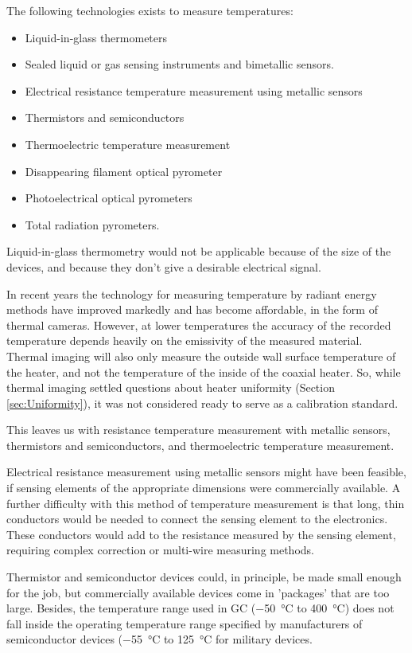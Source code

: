 The following technologies exists to measure temperatures:
\begin{itemize}
	\item Liquid-in-glass thermometers
	\item Sealed liquid or gas sensing instruments and bimetallic sensors.
	\item Electrical resistance temperature measurement using metallic sensors
	\item Thermistors and semiconductors
	\item Thermoelectric temperature measurement
	\item Disappearing filament optical pyrometer
	\item Photoelectrical optical pyrometers
	\item Total radiation pyrometers.
\end{itemize}

Liquid-in-glass thermometry would not be applicable because of the size of the
devices, and because they don't give a desirable electrical signal. 

In recent years the technology for measuring temperature by radiant energy
methods have improved markedly and has become affordable, in the form of thermal
cameras. However, at lower temperatures the accuracy of the recorded temperature
depends heavily on the emissivity of the measured material. Thermal imaging will
also only measure the outside wall surface temperature of the heater, and not
the temperature of the inside of the coaxial heater. So, while thermal imaging
settled questions about heater uniformity (Section \ref{sec:Uniformity}), it was
not considered ready to serve as a calibration standard. 

This leaves us with resistance temperature measurement with metallic sensors,
thermistors and semiconductors, and thermoelectric temperature measurement.

Electrical resistance measurement using metallic sensors might have been
feasible, if sensing elements of the appropriate dimensions were commercially
available. A further difficulty with this method of temperature measurement is
that long, thin conductors would be needed to connect the sensing element to the
electronics. These conductors would add to the resistance measured by the
sensing element, requiring complex correction or multi-wire measuring methods.

Thermistor and semiconductor devices could, in principle, be made small enough
for the job, but commercially available devices come in 'packages' that are too
large. Besides, the temperature range used in GC (\SI{-50}{\celsius} to
\SI{400}{\celsius}) does not fall inside the operating temperature range
specified by manufacturers of semiconductor devices (\SI{-55}{\celsius} to
\SI{125}{\celsius} for military devices.

